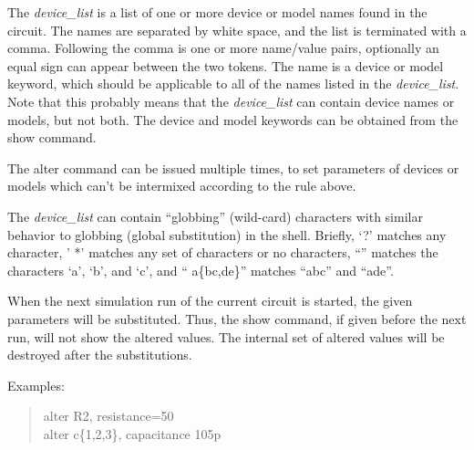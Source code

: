 The {\it device\_list} is a list of one or more device or model names
found in the circuit.  The names are separated by white space, and the
list is terminated with a comma.  Following the comma is one or more
name/value pairs, optionally an equal sign can appear between the two
tokens.  The name is a device or model keyword, which should be
applicable to all of the names listed in the {\it device\_list}.  Note
that this probably means that the {\it device\_list} can contain
device names or models, but not both.  The device and model keywords
can be obtained from the {\cb show} command.

The {\cb alter} command can be issued multiple times, to set
parameters of devices or models which can't be intermixed according to
the rule above.

The {\it device\_list} can contain ``globbing'' (wild-card)
characters with similar behavior to globbing (global substitution) in
the {\WRspice} shell.  Briefly, `{\vt ?}' matches any character, '{\vt
*}' matches any set of characters or no characters, ``{\vt [abc]}''
matches the characters `{\vt a}', `{\vt b}', and `{\vt c}', and ``{\vt
a}\{{\vt bc,de}\}'' matches ``{\vt abc}'' and ``{\vt ade}''.

When the next simulation run of the current circuit is started, the
given parameters will be substituted.  Thus, the {\cb show} command,
if given before the next run, will not show the altered values.  The
internal set of altered values will be destroyed after the
substitutions.

Examples:
\begin{quote}
{\vt alter R2, resistance=50}\\
{\vt alter c\{1,2,3\}, capacitance 105p}
\end{quote}

\subsection{}


